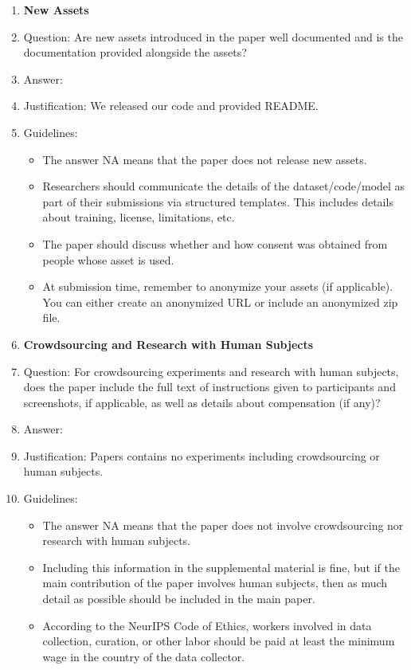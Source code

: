 \documentclass{article}
\theoremstyle{plain}
\theoremstyle{definition}
\theoremstyle{remark}
\theoremstyle{plain}
\begin{document}
\begin{enumerate}
\item {\bf New Assets}
    \item[] Question: Are new assets introduced in the paper well documented and is the documentation provided alongside the assets?
    \item[] Answer: \answerYes{}%
    \item[] Justification: We released our code and provided README.
    \item[] Guidelines:
    \begin{itemize}
        \item The answer NA means that the paper does not release new assets.
        \item Researchers should communicate the details of the dataset/code/model as part of their submissions via structured templates. This includes details about training, license, limitations, etc. 
        \item The paper should discuss whether and how consent was obtained from people whose asset is used.
        \item At submission time, remember to anonymize your assets (if applicable). You can either create an anonymized URL or include an anonymized zip file.
    \end{itemize}

\item {\bf Crowdsourcing and Research with Human Subjects}
    \item[] Question: For crowdsourcing experiments and research with human subjects, does the paper include the full text of instructions given to participants and screenshots, if applicable, as well as details about compensation (if any)? 
    \item[] Answer: \answerNA{} %
    \item[] Justification: Papers contains no experiments including crowdsourcing or human subjects.
    \item[] Guidelines:
    \begin{itemize}
        \item The answer NA means that the paper does not involve crowdsourcing nor research with human subjects.
        \item Including this information in the supplemental material is fine, but if the main contribution of the paper involves human subjects, then as much detail as possible should be included in the main paper. 
        \item According to the NeurIPS Code of Ethics, workers involved in data collection, curation, or other labor should be paid at least the minimum wage in the country of the data collector. 
    \end{itemize}


\end{enumerate}
\end{document}
